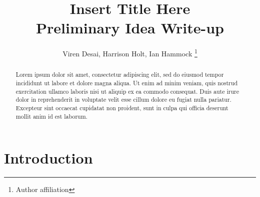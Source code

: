\newcommand*{\MyHeaderPath}{.}%
\newcommand*{\PathToAssets}{../assets}%
\newcommand*{\PathToOutput}{../output/}%








\title{
Insert Title Here
\\{\color{blue} \large Preliminary Idea Write-up}
}

\author{
Viren Desai, Harrison Holt, Ian Hammock \footnote{Author affiliation}
}
\begin{titlepage}
% 
\maketitle


\doublespacing
\begin{abstract}
Lorem ipsum dolor sit amet, consectetur adipiscing elit, sed do eiusmod tempor
incididunt ut labore et dolore magna aliqua. Ut enim ad minim veniam, quis
nostrud exercitation ullamco laboris nisi ut aliquip ex ea commodo consequat.
Duis aute irure dolor in reprehenderit in voluptate velit esse cillum dolore
eu fugiat nulla pariatur. Excepteur sint occaecat cupidatat non proident,
sunt in culpa qui officia deserunt mollit anim id est laborum.
\end{abstract}


\end{titlepage}

\doublespacing
\section{Introduction}

